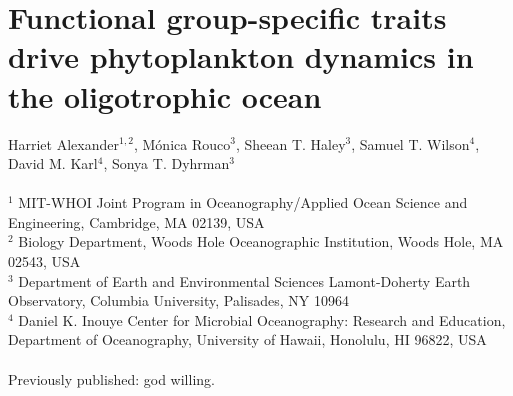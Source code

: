 

\chapter{Functional group-specific traits drive phytoplankton dynamics in the oligotrophic ocean}

\raggedbottom

\begin{singlespace}
Harriet Alexander$^{1,2}$, Mónica Rouco$^3$, Sheean T. Haley$^3$, Samuel T. Wilson$^4$, David M. Karl$^4$, Sonya T. Dyhrman$^{3}$\\
\\
$^{1}$ MIT-WHOI Joint Program in Oceanography/Applied Ocean Science and Engineering, Cambridge, MA 02139, USA\\
$^2$ Biology Department, Woods Hole Oceanographic Institution, Woods Hole, MA 02543, USA\\
$^3$ Department of Earth and Environmental Sciences Lamont-Doherty Earth Observatory, Columbia University, Palisades, NY 10964\\
$^4$ Daniel K. Inouye Center for Microbial Oceanography: Research and Education, Department of Oceanography, University of Hawaii, Honolulu, HI 96822, USA\\
\\
Previously published: god willing. 
\end{singlespace}


